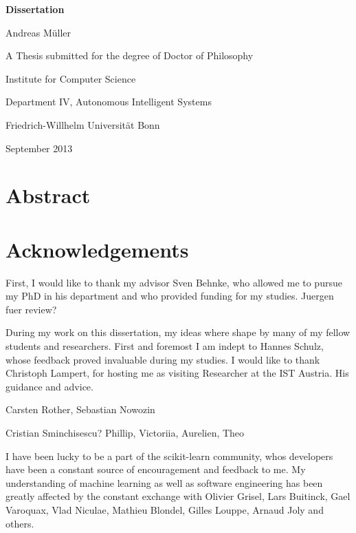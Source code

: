 \documentclass[12pt,toc=bibnumbered, a4paper,twoside]{scrbook}
\begin{document}
\begin{titlepage}
\begin{center}
\vspace*{1in}
\textbf{{\LARGE Dissertation}}
\par
\vspace{1.5in} {\large Andreas M\"uller}
 \par \vfill A Thesis submitted for the degree of Doctor of Philosophy
\par \vspace{0.5in}
Institute for Computer Science \par
Department IV, Autonomous Intelligent Systems
\par \vspace{0.5in}
Friedrich-Willhelm Universit\"at Bonn \par
\vspace{0.5in} September 2013 \end{center}

\end{titlepage}


\tableofcontents

\chapter*{Abstract}

\chapter*{Acknowledgements}
First, I would like to thank my advisor Sven Behnke, who allowed me
to pursue my PhD in his department and who provided funding for my studies.
Juergen fuer review?

During my work on this dissertation, my ideas where shape by many of my fellow
students and researchers. First and foremost I am indept to Hannes Schulz,
whose feedback proved invaluable during my studies.
I would like to thank Christoph Lampert, for hosting me as visiting Researcher
at the IST Austria. His guidance and advice.

Carsten Rother, Sebastian Nowozin

Cristian Sminchisescu?
Phillip, Victoriia, Aurelien, Theo

I have been lucky to be a part of the scikit-learn community, whos developers
have been a constant source of encouragement and feedback to me. My understanding
of machine learning as well as software engineering has been greatly affected
by the constant exchange with Olivier Grisel, Lars Buitinck, Gael Varoquax,
Vlad Niculae, Mathieu Blondel, Gilles Louppe, Arnaud Joly and others.
\end{document}
